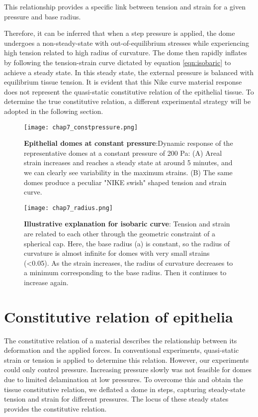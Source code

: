 This relationship provides a specific link between tension and strain
for a given pressure and base radius.

Therefore, it can be inferred that when a step pressure is applied, the
dome undergoes a non-steady-state with out-of-equilibrium stresses while
experiencing high tension related to high radius of curvature. The dome
then rapidly inflates by following the tension-strain curve dictated by
equation \ref{eqn:isobaric} to achieve
a steady state. In this steady state, the external pressure is balanced
with equilibrium tissue tension. It is evident that this Nike curve
material response does not represent the quasi-static constitutive
relation of the epithelial tissue. To determine the true constitutive
relation, a different experimental strategy will be adopted in the
following section.

\begin{figure}[t]
	\centering
	\texttt{[image: chap7\_constpressure.png]}
	\caption{\label{fig_7_3} \textbf{Epithelial domes at constant pressure}:Dynamic response of the representative domes at a constant pressure of 200 Pa: (A) Areal strain increases and reaches a steady state at around 5 minutes, and we can clearly see variability in the maximum strains. (B) The same domes produce a peculiar "NIKE swish" shaped tension and strain curve.
	}
\end{figure}

\begin{figure}
	\centering
	\texttt{[image: chap7\_radius.png]}
	\caption{\label{fig_7_4} \textbf{Illustrative explanation for isobaric curve}: Tension and strain are related to each other through the geometric constraint of a spherical cap. Here, the base radius (a) is constant, so the radius of curvature is almost infinite for domes with very small strains (<0.05). As the strain increases, the radius of curvature decreases to a minimum corresponding to the base radius. Then it continues to increase again.	
	}
\end{figure}

\hypertarget{constitutive-relation-of-epithelia}{%
	\section{Constitutive relation of
		epithelia}\label{constitutive-relation-of-epithelia}}

The constitutive relation of a material describes the relationship
between its deformation and the applied forces. In conventional
experiments, quasi-static strain or tension is applied to determine this
relation. However, our experiments could only control pressure.
Increasing pressure slowly was not feasible for domes due to limited
delamination at low pressures. To overcome this and obtain the tissue
constitutive relation, we deflated a dome in steps, capturing
steady-state tension and strain for different pressures. The locus of
these steady states provides the constitutive relation.

